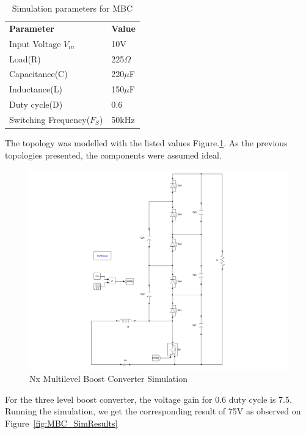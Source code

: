 \begin{table}[H]
\begin{center}
\caption {Simulation parameters for MBC} \label{tab:MBC} 
\begin{tabular}{|l|l|}
\cline{1-2}
\textbf{Parameter} & \textbf{Value}  \\ \cline{1-2}
Input Voltage $V_{in}$          &      10V   \\ \cline{1-2}
Load(R)   & 225$\Omega$           \\ \cline{1-2}
Capacitance(C)          &       220$\mu$F     \\ \cline{1-2}
Inductance(L)          &      150$\mu$F      \\ \cline{1-2}
Duty cycle(D)          &     0.6       \\ \cline{1-2}
Switching Frequency($F_S$)          &      50kHz      \\ \cline{1-2}
\end{tabular}
\end{center}
\end{table}

The  topology was modelled with the listed values Figure.\ref{fig:MBC_Sim}. As the previous topologies presented, the components were assumed ideal.

\begin{figure}[H]
   \centering
   \includegraphics[width=\textwidth]{figures/yMultilevel/MCB_Simulation.pdf}
    \caption{Nx Multilevel Boost Converter Simulation}
	\label{fig:MBC_Sim}
\end{figure}

For the three level boost converter, the voltage gain for 0.6 duty cycle is 7.5. Running the simulation, we get the corresponding result of 75V as observed on 
Figure~\ref{fig:MBC_SimResults}

